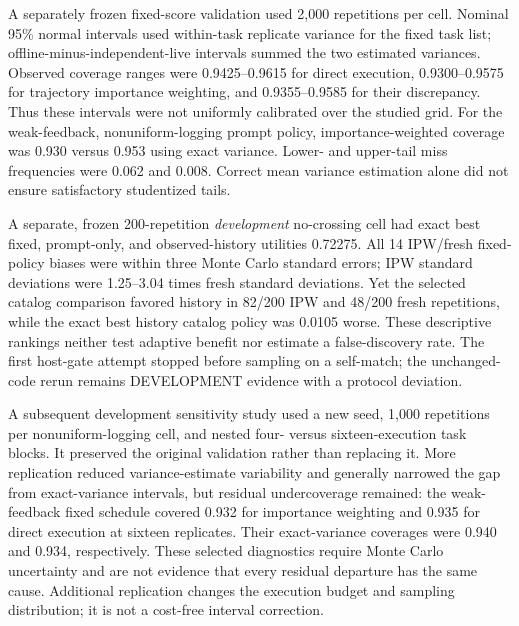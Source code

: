 A separately frozen fixed-score validation used 2,000 repetitions per cell. Nominal 95\% normal intervals
used within-task replicate variance for the fixed task list; offline-minus-independent-live intervals summed
the two estimated variances. Observed coverage ranges were 0.9425--0.9615 for direct execution,
0.9300--0.9575 for trajectory importance weighting, and 0.9355--0.9585 for their discrepancy. Thus these intervals
were not uniformly calibrated over the studied grid. For the weak-feedback, nonuniform-logging prompt policy,
importance-weighted coverage was 0.930 versus 0.953 using exact variance. Lower- and upper-tail miss frequencies
were 0.062 and 0.008. Correct mean variance estimation alone did not ensure satisfactory studentized tails.

A separate, frozen 200-repetition \emph{development} no-crossing cell had exact best fixed,
prompt-only, and observed-history utilities 0.72275. All 14 IPW/fresh fixed-policy biases
were within three Monte Carlo standard errors; IPW standard deviations were 1.25--3.04
times fresh standard deviations. Yet the selected catalog comparison favored history in
82/200 IPW and 48/200 fresh repetitions, while the exact best history catalog policy
was 0.0105 worse. These descriptive rankings neither test adaptive benefit nor estimate
a false-discovery rate. The first host-gate attempt stopped before sampling on a
self-match; the unchanged-code rerun remains DEVELOPMENT evidence with a protocol deviation.

A subsequent development sensitivity study used a new seed, 1,000 repetitions per nonuniform-logging cell,
and nested four- versus sixteen-execution task blocks. It preserved the original validation rather than
replacing it. More replication reduced variance-estimate variability and generally narrowed the gap from
exact-variance intervals, but residual undercoverage remained: the weak-feedback fixed schedule covered
0.932 for importance weighting and 0.935 for direct execution at sixteen replicates. Their exact-variance
coverages were 0.940 and 0.934, respectively. These selected diagnostics require Monte Carlo uncertainty and
are not evidence that every residual departure has the same cause. Additional replication changes the
execution budget and sampling distribution; it is not a cost-free interval correction.

